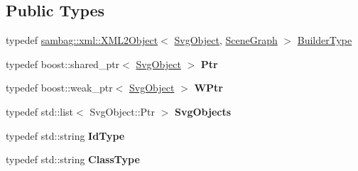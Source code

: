 \subsection*{Public Types}
\begin{DoxyCompactItemize}
\item 
typedef \hyperlink{classsambag_1_1xml_1_1_x_m_l2_object}{sambag::xml::XML2Object}$<$ \hyperlink{classsambag_1_1disco_1_1svg_1_1_svg_object}{SvgObject}, \hyperlink{classsambag_1_1disco_1_1graphic_elements_1_1_scene_graph}{SceneGraph} $>$ \hyperlink{classsambag_1_1disco_1_1svg_1_1_svg_object_af28e33e92eb4e235101d9f4a66c69a6f}{BuilderType}
\item 
\hypertarget{classsambag_1_1disco_1_1svg_1_1_svg_object_aff27d18dd0c94f46600edf6ace085ed9}{
typedef boost::shared\_\-ptr$<$ \hyperlink{classsambag_1_1disco_1_1svg_1_1_svg_object}{SvgObject} $>$ {\bfseries Ptr}}
\label{classsambag_1_1disco_1_1svg_1_1_svg_object_aff27d18dd0c94f46600edf6ace085ed9}

\item 
\hypertarget{classsambag_1_1disco_1_1svg_1_1_svg_object_aa35d1e492d0cc0bc8b87d7b8674da0bb}{
typedef boost::weak\_\-ptr$<$ \hyperlink{classsambag_1_1disco_1_1svg_1_1_svg_object}{SvgObject} $>$ {\bfseries WPtr}}
\label{classsambag_1_1disco_1_1svg_1_1_svg_object_aa35d1e492d0cc0bc8b87d7b8674da0bb}

\item 
\hypertarget{classsambag_1_1disco_1_1svg_1_1_svg_object_a5f38522de0c74a49514e6fba84e9fcb1}{
typedef std::list$<$ SvgObject::Ptr $>$ {\bfseries SvgObjects}}
\label{classsambag_1_1disco_1_1svg_1_1_svg_object_a5f38522de0c74a49514e6fba84e9fcb1}

\item 
\hypertarget{classsambag_1_1disco_1_1svg_1_1_svg_object_af0f032eff537e1eb1582978865a3a320}{
typedef std::string {\bfseries IdType}}
\label{classsambag_1_1disco_1_1svg_1_1_svg_object_af0f032eff537e1eb1582978865a3a320}

\item 
\hypertarget{classsambag_1_1disco_1_1svg_1_1_svg_object_a979d239ab9ef07722ceca86d05c8d967}{
typedef std::string {\bfseries ClassType}}
\label{classsambag_1_1disco_1_1svg_1_1_svg_object_a979d239ab9ef07722ceca86d05c8d967}

\end{DoxyCompactItemize}
